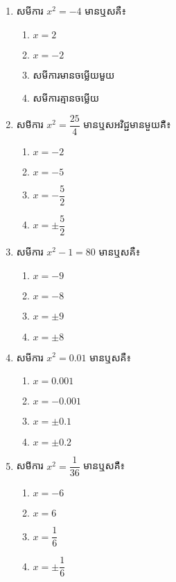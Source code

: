 \begin{enumerate}
\item សមីការ $x^2=-4$ មានឬសគឺ៖
\begin{enumerate}[k,4]
	\item $x=2$
	\item $x=-2$
	\item សមីការមានចម្លើយមួយ
	\item សមីការគ្មានចម្លើយ
\end{enumerate}

\item សមីការ $x^2=\dfrac{25}{4}$ មានឬសអវិជ្ជមានមួយគឺ៖
\begin{enumerate}[k,4]
	\item $x=-2$
	\item $x=-5$
	\item $x=-\dfrac{5}{2}$
	\item $x=\pm \dfrac{5}{2}$
\end{enumerate}

\item សមីការ $x^2-1=80$ មានឬសគឺ៖
\begin{multicols}{4}
\begin{enumerate}[label=\alph*.]
	\item $x=-9$
	\item $x=-8$
	\item $x=\pm 9$
	\item $x=\pm 8$
\end{enumerate}
\end{multicols}

\item សមីការ $x^2=0.01$ មានឬសគឺ៖
\begin{multicols}{4}
\begin{enumerate}[label=\alph*.]
	\item $x=0.001$
	\item $x=-0.001$
	\item $x=\pm 0.1$
	\item $x=\pm 0.2$
\end{enumerate}
\end{multicols}

\item សមីការ $x^2=\dfrac{1}{36}$ មានឬសគឺ៖
\begin{multicols}{4}
\begin{enumerate}[label=\alph*.]
	\item $x=-6$
	\item $x=6$
	\item $x=\dfrac{1}{6}$
	\item $x=\pm \dfrac{1}{6}$
\end{enumerate}
\end{multicols}


\end{enumerate}
